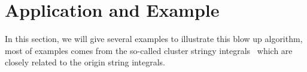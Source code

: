 \documentclass[12pt]{article}
\theoremstyle{definition}
\newtheorem{defi}[para]{Definition}
\theoremstyle{plain}
\begin{document}
% 
% 


\section{Application and Example}

In this section, we will give several examples to illustrate this blow up algorithm, most of examples comes from the so-called cluster stringy integrals~\cite{} which are closely related to the origin string integrals.
\end{document}
